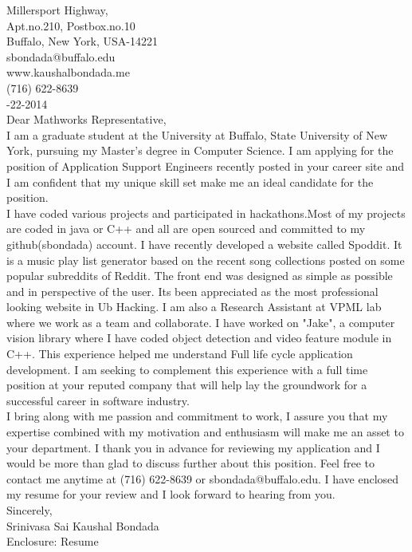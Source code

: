 \documentclass[10pt,letterpaper,oneside]{article}
\begin{document}
 Millersport Highway,\\
Apt.no.210, Postbox.no.10\\
Buffalo, New York, USA-14221\\
sbondada@buffalo.edu\\
www.kaushalbondada.me\\
(716) 622-8639\\

-22-2014\\
 
\noindent Dear Mathworks Representative,\\
 
I am a graduate student at the University at Buffalo, State University of New York, pursuing my Master's degree in Computer Science. I am
applying
for the position of Application Support Engineers recently posted in your career site and I am confident that my unique skill set
make me an ideal candidate for the position.\\

I have coded various projects and participated in hackathons.Most of my projects are coded in java or C++ and all are open sourced and
committed to my github(sbondada) account. I have recently developed a website called Spoddit. It is a music play list generator based on the
recent song collections posted on some popular subreddits of Reddit. The front end was designed as simple as possible and in perspective of the
user. Its been
appreciated as the most professional looking website in Ub Hacking. I am also a Research Assistant at VPML lab where we work as a team and collaborate. I have worked on "Jake", a computer vision
library where I have coded object detection and video feature module in C++. This experience helped me understand Full life cycle application development. I am seeking to complement this experience with a full time position at your reputed company that will help lay the groundwork for a successful career in software industry.\\

I bring along with me passion and commitment to work, I assure you that my expertise combined with my motivation
and enthusiasm will make me an asset to your department. I thank you in advance for reviewing my application and I would be more than glad to
discuss further about this position. Feel free to contact me anytime at (716) 622-8639 or sbondada@buffalo.edu. I have enclosed my resume for your review and I look forward to hearing from you.\\
 
\noindent Sincerely,\\
Srinivasa Sai Kaushal Bondada\\
Enclosure: Resume\\
\end{document}
